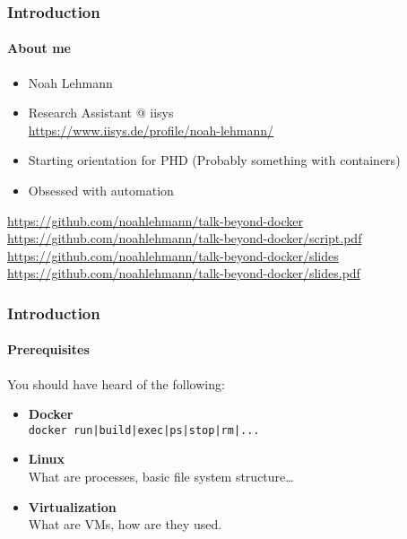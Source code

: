 \begin{frame}[c]
    \frametitle{Introduction}
    \framesubtitle{About me}
    \begin{itemize}
        \item Noah Lehmann
        \item Research Assistant @ iisys\\ \url{https://www.iisys.de/profile/noah-lehmann/}
        \item Starting orientation for PHD (Probably something with containers)
        \item Obsessed with automation
    \end{itemize}
    \vspace{0.3cm}
    \url{https://github.com/noahlehmann/talk-beyond-docker}\\
    \url{https://github.com/noahlehmann/talk-beyond-docker/script.pdf}\\
    \url{https://github.com/noahlehmann/talk-beyond-docker/slides}\\
    \url{https://github.com/noahlehmann/talk-beyond-docker/slides.pdf}
\end{frame}

\begin{frame}[c]
    \frametitle{Introduction}
    \framesubtitle{Prerequisites}
    You should have heard of the following:
    \vspace{0.5cm}
    \begin{itemize}
        \item \textbf{Docker}\\
        \texttt{docker run|build|exec|ps|stop|rm|...}
        \item \textbf{Linux}\\
        What are processes, basic file system structure\ldots
        \item \textbf{Virtualization}\\
        What are VMs, how are they used.
    \end{itemize}
\end{frame}